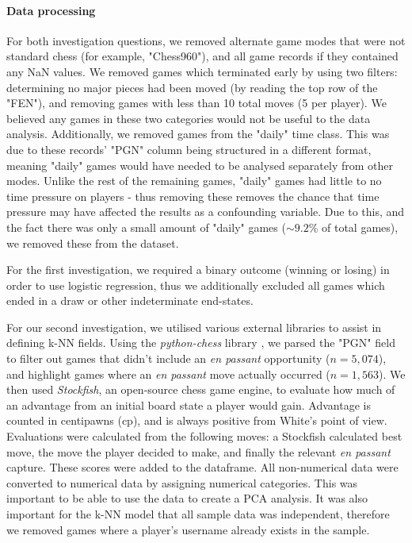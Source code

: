 \documentclass[10pt,a4paper]{article}
\begin{document}
\begin{multicols}{2}
\paragraph{Data processing}
For both investigation questions, we removed alternate game modes that were not standard chess (for example, "Chess960"), and all game records if they contained any NaN values. We removed games which terminated early by using two filters: determining no major pieces had been moved (by reading the top row of the "FEN"), and removing games with less than 10 total moves (5 per player). We believed any games in these two categories would not be useful to the data analysis. Additionally, we removed games from the "daily" time class. This was due to these records' "PGN" column being structured in a different format, meaning "daily" games would have needed to be analysed separately from other modes. Unlike the rest of the remaining games, "daily" games had little to no time pressure on players - thus removing these removes the chance that time pressure may have affected the results as a confounding variable. Due to this, and the fact there was only a small amount of "daily" games ($\sim9.2\%$ of total games), we removed these from the dataset.\newline

For the first investigation, we required a binary outcome (winning or losing) in order to use logistic regression, thus we additionally excluded all games which ended in a draw or other indeterminate end-states. \newline

For our second investigation, we utilised various external libraries to assist in defining k-NN fields. Using the \textit{python-chess} library \cite{python-chess}, we parsed the "PGN" field to filter out games that didn't include an \textit{en passant} opportunity ($n=5,074$), and highlight games where an \textit{en passant} move actually occurred ($n=1,563$). We then used \textit{Stockfish}\cite{StockFish}, an open-source chess game engine, to evaluate how much of an advantage from an initial board state a player would gain. Advantage is counted in centipawns (cp), and is always positive from White's point of view. Evaluations were calculated from the following moves: a Stockfish calculated best move, the move the player decided to make, and finally the relevant \textit{en passant} capture. These scores were added to the dataframe. All non-numerical data were converted to numerical data by assigning numerical categories. This was important to be able to use the data to create a PCA analysis. It was also important for the k-NN model that all sample data was independent, therefore we removed games where a player's username already exists in the sample.\newline



\end{multicols}
\end{document}
